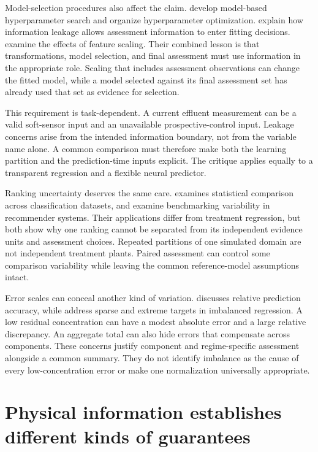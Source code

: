 Model-selection procedures also affect the claim. \citet{Bergstra2011} develop model-based hyperparameter search and \citet{Akiba2019} organize hyperparameter optimization. \citet{Kaufman2012} explain how information leakage allows assessment information to enter fitting decisions. \citet{Pinheiro2025} examine the effects of feature scaling. Their combined lesson is that transformations, model selection, and final assessment must use information in the appropriate role. Scaling that includes assessment observations can change the fitted model, while a model selected against its final assessment set has already used that set as evidence for selection.

This requirement is task-dependent. A current effluent measurement can be a valid soft-sensor input and an unavailable prospective-control input. Leakage concerns arise from the intended information boundary, not from the variable name alone. A common comparison must therefore make both the learning partition and the prediction-time inputs explicit. The critique applies equally to a transparent regression and a flexible neural predictor.

Ranking uncertainty deserves the same care. \citet{Demsar2006} examines statistical comparison across classification datasets, and \citet{Shevchenko2024} examine benchmarking variability in recommender systems. Their applications differ from treatment regression, but both show why one ranking cannot be separated from its independent evidence units and assessment choices. Repeated partitions of one simulated domain are not independent treatment plants. Paired assessment can control some comparison variability while leaving the common reference-model assumptions intact.

Error scales can conceal another kind of variation. \citet{Tofallis2015} discusses relative prediction accuracy, while \citet{Shahbazi2026} address sparse and extreme targets in imbalanced regression. A low residual concentration can have a modest absolute error and a large relative discrepancy. An aggregate total can also hide errors that compensate across components. These concerns justify component and regime-specific assessment alongside a common summary. They do not identify imbalance as the cause of every low-concentration error or make one normalization universally appropriate.

\section{Physical information establishes different kinds of guarantees}

